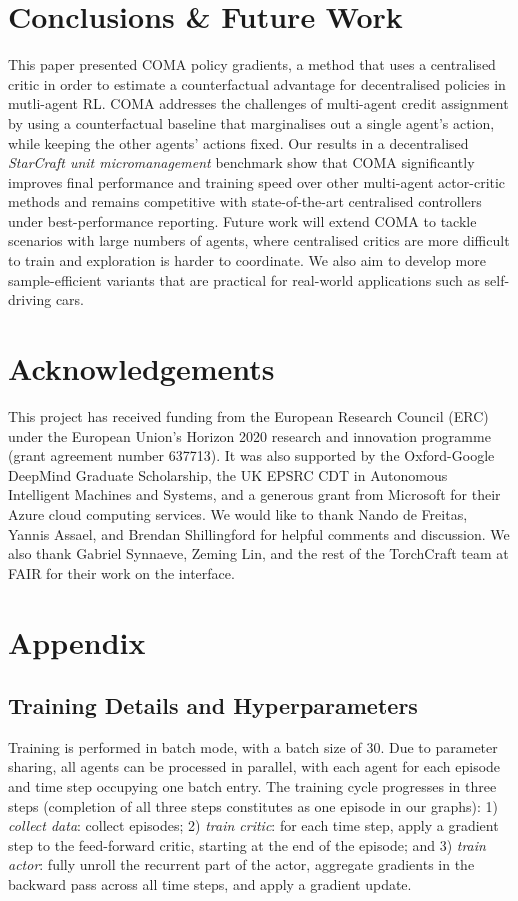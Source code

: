 \documentclass[letterpaper]{article}
\begin{document}
\section{Conclusions \& Future Work}
\label{sec:conclusion}

This paper presented COMA policy gradients, a method that uses a centralised 
critic in order to estimate a counterfactual advantage for decentralised 
policies in mutli-agent RL. COMA addresses the challenges of multi-agent credit 
assignment by using a counterfactual baseline that marginalises out a single 
agent's action, while keeping the other agents' actions fixed. Our results in a 
decentralised \emph{StarCraft unit micromanagement} benchmark show that COMA 
significantly improves final performance and training speed over other 
multi-agent actor-critic methods and remains competitive with state-of-the-art 
centralised controllers under best-performance reporting. Future work will 
extend COMA to tackle scenarios with large numbers of agents, where centralised 
critics are more difficult to train and exploration is harder to coordinate. We 
also aim to develop more  sample-efficient variants that are practical for 
real-world applications such as self-driving cars.

\section*{Acknowledgements} 
This project has received funding from the European Research Council (ERC) under the European Union's Horizon 2020 research and innovation programme (grant agreement number 637713).  It was also supported by the Oxford-Google DeepMind Graduate Scholarship, the 
UK EPSRC CDT in Autonomous Intelligent Machines and Systems, and a generous 
grant from Microsoft for their Azure cloud computing services.
We would like to thank Nando de Freitas, Yannis Assael, and Brendan Shillingford
for helpful comments and discussion. We also thank Gabriel Synnaeve, Zeming Lin,
and the rest of the TorchCraft team at FAIR for their work on the interface.





\newpage
\onecolumn
\section*{Appendix}
\subsection*{Training Details and Hyperparameters}
Training is performed in batch mode, with a batch size of 30. Due to parameter 
sharing,  all agents can be processed in parallel, with each agent for each 
episode and time step occupying one batch entry. The training cycle progresses 
in three steps (completion of all three steps constitutes as one episode in our 
graphs):
1) \emph{collect data}: collect  episodes;
2) \emph{train critic}: for each time step, apply a gradient step to the 
feed-forward critic, starting at the end of the episode; and
3) \emph{train actor}: fully unroll the recurrent part of the actor, aggregate 
gradients in the backward pass across all time steps, and apply a gradient 
update. 
\end{document}
